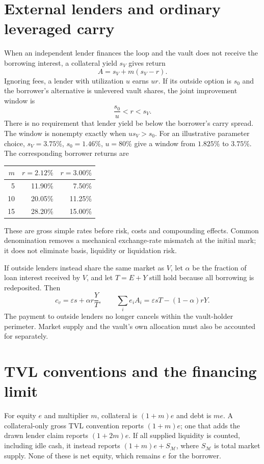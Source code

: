 \documentclass[12pt,oneside]{article}
\begin{document}
\section{External lenders and ordinary leveraged carry}
\label{app:external}
When an independent lender finances the loop and the vault does not
receive the borrowing interest, a collateral yield $s_V$ gives return
\[
 A=s_V+m(s_V-r).
\]
Ignoring fees, a lender with utilization $u$ earns $ur$. If its
outside option is $s_0$ and the borrower's alternative is unlevered
vault shares, the joint improvement window is
\[
 \frac{s_0}{u}<r<s_V.
\]
There is no requirement that lender yield be below the borrower's
carry spread. The window is nonempty exactly when $us_V>s_0$.
For an illustrative parameter choice, $s_V=3.75\%$, $s_0=1.46\%$, $u=80\%$ give a window from
$1.825\%$ to $3.75\%$. The corresponding borrower returns are
\begin{center}
\begin{tabular}{rrr}
\toprule
$m$ & $r=2.12\%$ & $r=3.00\%$\\
\midrule
5 & 11.90\% & 7.50\%\\
10 & 20.05\% & 11.25\%\\
15 & 28.20\% & 15.00\%\\
\bottomrule
\end{tabular}
\end{center}
These are gross simple rates before risk, costs and compounding effects.
Common denomination removes a mechanical exchange-rate mismatch at the
initial mark; it does not eliminate basis, liquidity or liquidation risk.

If outside lenders instead share the same market as $V$, let $\alpha$
be the fraction of loan interest received by $V$, and let
$T=E+Y$ still hold because all borrowing is redeposited. Then
\[
 c_v=\varepsilon s+\alpha r\frac{Y}{T},\qquad
 \sum_i e_iA_i=\varepsilon sT-(1-\alpha)rY.
\]
The payment to outside lenders no longer cancels within the vault-holder
perimeter. Market supply and the vault's own allocation must also be
accounted for separately.

\section{TVL conventions and the financing limit}
\label{app:tvl}
For equity $e$ and multiplier $m$, collateral is $(1+m)e$ and debt is
$me$. A collateral-only gross TVL convention reports $(1+m)e$; one
that adds the drawn lender claim reports $(1+2m)e$. If all supplied
liquidity is counted, including idle cash, it instead reports
$(1+m)e+S_{\mathcal M}$, where $S_{\mathcal M}$ is total market supply.
None of these is net equity, which remains $e$ for the borrower.
\end{document}
